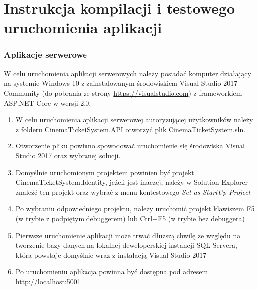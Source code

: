 \section*{Instrukcja kompilacji i testowego uruchomienia aplikacji}
\subsubsection*{Aplikacje serwerowe}
W celu uruchomienia aplikacji serwerowych należy posiadać komputer działający na systemie Windows 10 z zainstalowanym środowiskiem Visual Studio 2017 Community (do pobrania ze strony \url{https://visualstudio.com}) z frameworkiem ASP.NET Core w wersji 2.0.

\begin{enumerate}
\item W celu uruchomienia aplikacji serwerowej autoryzującej użytkowników należy z folderu CinemaTicketSystem.API otworzyć plik CinemaTicketSystem.sln.
\item Otworzenie pliku powinno spowodować uruchomienie się środowiska Visual Studio 2017 oraz wybranej solucji.
\item Domyślnie uruchomionym projektem powinien być projekt CinemaTicketSystem.Identity, jeżeli jest inaczej, należy w Solution Explorer znaleźć ten projekt oraz wybrać z menu kontestowego \textit{Set as StartUp Project}
\item Po wybraniu odpowiedniego projektu, należy uruchomić projekt klawiszem F5 (w trybie z podpiętym debuggerem) lub Ctrl+F5 (w trybie bez debuggera)
\item Pierwsze uruchomienie aplikacji może trwać dłuższą chwilę ze względu na tworzenie bazy danych na lokalnej deweloperskiej instancji SQL Servera, która powstaje domyślnie wraz z instalacją Visual Studio 2017
\item Po uruchomieniu aplikacja powinna być dostępna pod adresem \url{http://localhost:5001}
\end{enumerate}
\newpage
